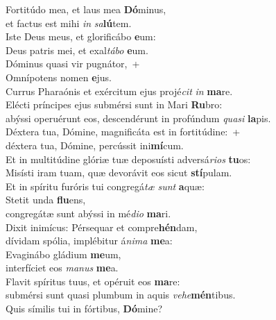 \evenverse Fortitúdo mea, et laus mea \textbf{Dó}minus,~\*\\
\evenverse et factus est mihi \textit{in} \textit{sa}\textbf{lú}tem.\\
\oddverse Iste Deus meus, et glorificábo \textbf{e}um:~\*\\
\oddverse Deus patris mei, et exal\textit{tá}\textit{bo} \textbf{e}um.\\
\evenverse Dóminus quasi vir pugnátor,~+\\
\evenverse  Omnípotens nomen \textbf{e}jus.~\*\\
\evenverse Currus Pharaónis et exércitum ejus projé\textit{cit} \textit{in} \textbf{ma}re.\\
\oddverse Elécti príncipes ejus submérsi sunt in Mari \textbf{Ru}bro:~\*\\
\oddverse abýssi operuérunt eos, descendérunt in profúndum \textit{qua}\textit{si} \textbf{la}pis.\\
\evenverse Déxtera tua, Dómine, magnificáta est in fortitúdine:~+\\
\evenverse  déxtera tua, Dómine, percússit ini\textbf{mí}cum.~\*\\
\evenverse Et in multitúdine glóriæ tuæ deposuísti adversá\textit{ri}\textit{os} \textbf{tu}os:\\
\oddverse Misísti iram tuam, quæ devorávit eos sicut \textbf{stí}pulam.~\*\\
\oddverse Et in spíritu furóris tui congregá\textit{tæ} \textit{sunt} \textbf{a}quæ:\\
\evenverse Stetit unda \textbf{flu}ens,~\*\\
\evenverse congregátæ sunt abýssi in mé\textit{di}\textit{o} \textbf{ma}ri.\\
\oddverse Dixit inimícus: Pérsequar et compre\textbf{hén}dam,~\*\\
\oddverse dívidam spólia, implébitur á\textit{ni}\textit{ma} \textbf{me}a:\\
\evenverse Evaginábo gládium \textbf{me}um,~\*\\
\evenverse interfíciet eos \textit{ma}\textit{nus} \textbf{me}a.\\
\oddverse Flavit spíritus tuus, et opéruit eos \textbf{ma}re:~\*\\
\oddverse submérsi sunt quasi plumbum in aquis \textit{ve}\textit{he}\textbf{mén}tibus.\\
\evenverse Quis símilis tui in fórtibus, \textbf{Dó}mine?~\*\\
